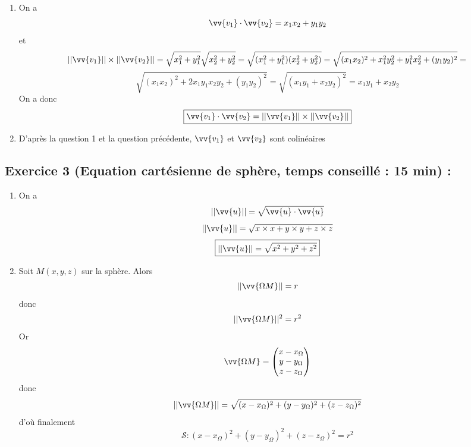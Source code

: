 \begin{enumerate}
\item On a $$\vv{v_1} \cdot \vv{v_2} = x_1x_2 + y_1y_2$$ et $$||\vv{v_1}|| \times ||\vv{v_2}|| = \sqrt{x_1^2 + y_1^2}\sqrt{x_2^2+y_2^2} =\sqrt{(x_1^2+y_1^2)(x_2^2+y_2^2)} = \sqrt{(x_1x_2)^2 + x_1^2y_2^2 + y_1^2x_2^2 + (y_1y_2)^2} = $$ $$\sqrt{(x_1x_2)^2 + 2x_1y_1x_2y_2 + (y_1y_2)^2} = \sqrt{(x_1y_1+x_2y_2)^2} = x_1y_1+x_2y_2$$
On a donc 
$$\boxed{\vv{v_1}\cdot \vv{v_2} = ||\vv{v_1}|| \times ||\vv{v_2}||}$$
\item D'après la question 1 et la question précédente, $\vv{v_1}$ et $\vv{v_2}$ sont colinéaires
\end{enumerate}
\subsection*{Exercice 3 (Equation cartésienne de sphère, temps conseillé : 15 min) : }
\begin{enumerate}
\item On a $$||\vv{u}|| = \sqrt{\vv{u}\cdot\vv{u}}$$
$$||\vv{u}|| = \sqrt{x\times x + y \times y + z\times z}$$
$$\boxed{||\vv{u}|| = \sqrt{x^2+y^2+z^2}}$$
\item Soit $M(x,y,z)$ sur la sphère. Alors $$||\vv{\Omega M}|| = r$$ donc $$||\vv{\Omega M}||^2 = r^2$$ Or $$\vv{\Omega M} = \begin{pmatrix} x - x_\Omega \\ y-y_\Omega \\ z - z_\Omega\end{pmatrix}$$ donc $$||\vv{\Omega M}|| = \sqrt{(x-x_\Omega)^2 + (y-y_\Omega)^2 + (z-z_\Omega)^2}$$ d'où finalement 
$$\boxed{\mathscr{S}:(x-x_\Omega)^2 + (y-y_\Omega)^2 + (z-z_\Omega)^2 = r^2}$$
\end{enumerate}

